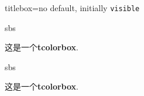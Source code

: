 \begin{docTcbKey}[][doc new=2019-03-01]{titlebox}{=}{no default, initially \texttt{visible}}



\begin{dispExample*}{sbs}
\begin{tcolorbox}[title=我的不可见标题,
titlebox=invisible]
这是一个\textbf{tcolorbox}.
\end{tcolorbox}
\end{dispExample*}

\begin{dispExample*}{sbs}
\begin{tcolorbox}[title=我的可见标题,
titlebox=visible]
这是一个\textbf{tcolorbox}.
\end{tcolorbox}
\end{dispExample*}
\end{docTcbKey}




